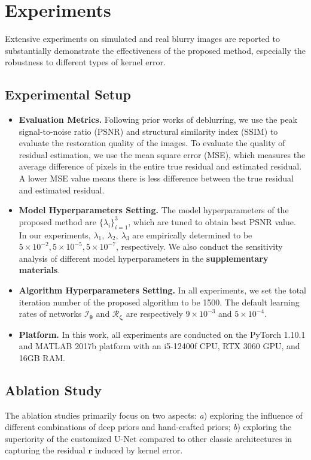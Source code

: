 \documentclass[10pt,twocolumn,letterpaper]{article}
\begin{document}
	\section{Experiments}
	Extensive experiments on simulated and real blurry images are reported to substantially demonstrate the effectiveness of the proposed method, especially the robustness to different types of kernel error.
	\subsection{Experimental Setup}
	
	\begin{itemize}	
		
		\item \textbf{Evaluation Metrics.}
		Following prior works of deblurring, we use the peak signal-to-noise ratio (PSNR) and structural similarity index (SSIM) to evaluate the restoration quality of the images. To evaluate the quality of residual estimation, we use the mean square error (MSE), which measures the average difference of pixels in the entire true residual and estimated residual. A lower MSE value means there is less difference between the true residual and estimated residual.
		
		\item \textbf{Model Hyperparameters Setting.} The model hyperparameters of the proposed method are $\{\lambda_i\}_{i=1}^{3}$, which are tuned to obtain best PSNR value.  In our experiments, $\lambda_1,~\lambda_2,~\lambda_3$ are empirically determined to be $5\times10^{-2},5\times10^{-5},5\times10^{-7}$, respectively. We also conduct the sensitivity analysis of different model hyperparameters in the \textbf{supplementary materials}.
		\item \textbf{Algorithm Hyperparameters Setting.} In all experiments, we set the total iteration number of the proposed algorithm to be 1500.  The default learning rates of networks $\mathcal I_{\bm\theta}$ and $\mathcal R_{\bm\zeta}$ are respectively $9\times10^{-3}$ and $5\times10^{-4}$. 
		\item \textbf{Platform.} In this work, all experiments are conducted on the PyTorch 1.10.1 and MATLAB 2017b platform with an i5-12400f CPU, RTX 3060 GPU, and 16GB RAM.
	\end{itemize}
	\subsection{Ablation Study}
	The ablation studies primarily focus on two aspects: {\it a}) exploring the influence of different combinations of deep priors and hand-crafted priors; {\it b}) exploring the superiority of the customized U-Net compared to other classic architectures in capturing the residual $\bm r$ induced by kernel error. 
\end{document}
